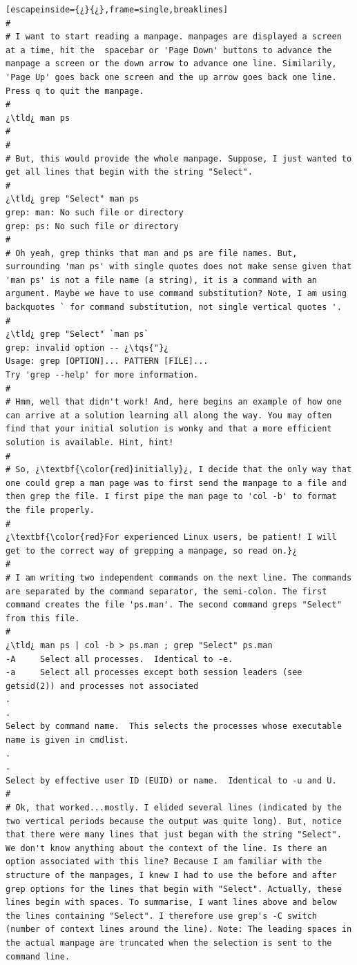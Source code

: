 \begin{lstlisting}[escapeinside={¿}{¿},frame=single,breaklines]
#
# I want to start reading a manpage. manpages are displayed a screen at a time, hit the  spacebar or 'Page Down' buttons to advance the manpage a screen or the down arrow to advance one line. Similarily, 'Page Up' goes back one screen and the up arrow goes back one line. Press q to quit the manpage.
#
¿\tld¿ man ps
#
#
# But, this would provide the whole manpage. Suppose, I just wanted to get all lines that begin with the string "Select".
#
¿\tld¿ grep "Select" man ps
grep: man: No such file or directory
grep: ps: No such file or directory
#
# Oh yeah, grep thinks that man and ps are file names. But, surrounding 'man ps' with single quotes does not make sense given that 'man ps' is not a file name (a string), it is a command with an argument. Maybe we have to use command substitution? Note, I am using backquotes ` for command substitution, not single vertical quotes '.
# 
¿\tld¿ grep "Select" `man ps`
grep: invalid option -- ¿\tqs{"}¿
Usage: grep [OPTION]... PATTERN [FILE]...
Try 'grep --help' for more information.
#
# Hmm, well that didn't work! And, here begins an example of how one can arrive at a solution learning all along the way. You may often find that your initial solution is wonky and that a more efficient solution is available. Hint, hint!
#
# So, ¿\textbf{\color{red}initially}¿, I decide that the only way that one could grep a man page was to first send the manpage to a file and then grep the file. I first pipe the man page to 'col -b' to format the file properly. 
#
¿\textbf{\color{red}For experienced Linux users, be patient! I will get to the correct way of grepping a manpage, so read on.}¿
#
# I am writing two independent commands on the next line. The commands are separated by the command separator, the semi-colon. The first command creates the file 'ps.man'. The second command greps "Select" from this file.
#
¿\tld¿ man ps | col -b > ps.man ; grep "Select" ps.man
-A     Select all processes.  Identical to -e.
-a     Select all processes except both session leaders (see getsid(2)) and processes not associated
.
.
Select by command name.  This selects the processes whose executable name is given in cmdlist.
.
.
Select by effective user ID (EUID) or name.  Identical to -u and U.
#
# Ok, that worked...mostly. I elided several lines (indicated by the two vertical periods because the output was quite long). But, notice that there were many lines that just began with the string "Select". We don't know anything about the context of the line. Is there an option associated with this line? Because I am familiar with the structure of the manpages, I knew I had to use the before and after grep options for the lines that begin with "Select". Actually, these lines begin with spaces. To summarise, I want lines above and below the lines containing "Select". I therefore use grep's -C switch (number of context lines around the line). Note: The leading spaces in the actual manpage are truncated when the selection is sent to the command line.

\end{lstlisting}
